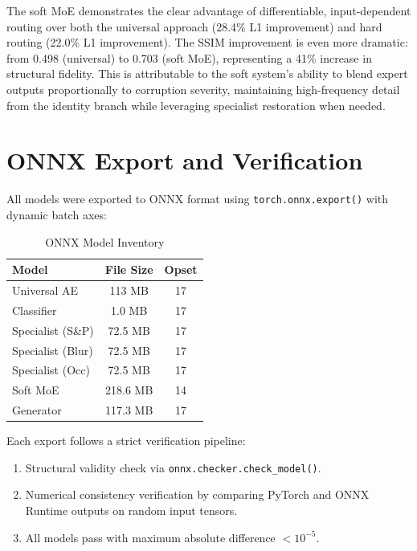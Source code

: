 \documentclass[conference]{IEEEtran}
\begin{document}
The soft MoE demonstrates the clear advantage of differentiable, input-dependent routing over both the universal approach (28.4\% L1 improvement) and hard routing (22.0\% L1 improvement). The SSIM improvement is even more dramatic: from 0.498 (universal) to 0.703 (soft MoE), representing a 41\% increase in structural fidelity. This is attributable to the soft system's ability to blend expert outputs proportionally to corruption severity, maintaining high-frequency detail from the identity branch while leveraging specialist restoration when needed.

\section{ONNX Export and Verification}
\label{sec:onnx}

All models were exported to ONNX format using \texttt{torch.onnx.export()} with dynamic batch axes:

\begin{table}[H]
\centering
\caption{ONNX Model Inventory}
\label{tab:onnx}
\begin{tabular}{lcc}
\toprule
\textbf{Model} & \textbf{File Size} & \textbf{Opset} \\
\midrule
Universal AE & 113 MB & 17 \\
Classifier & 1.0 MB & 17 \\
Specialist (S\&P) & 72.5 MB & 17 \\
Specialist (Blur) & 72.5 MB & 17 \\
Specialist (Occ) & 72.5 MB & 17 \\
Soft MoE & 218.6 MB & 14 \\
Generator & 117.3 MB & 17 \\
\bottomrule
\end{tabular}
\end{table}

Each export follows a strict verification pipeline:
\begin{enumerate}
    \item Structural validity check via \texttt{onnx.checker.check\_model()}.
    \item Numerical consistency verification by comparing PyTorch and ONNX Runtime outputs on random input tensors.
    \item All models pass with maximum absolute difference $< 10^{-5}$.
\end{enumerate}
\end{document}
